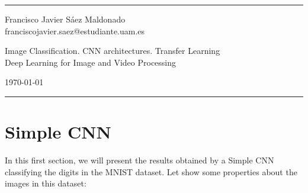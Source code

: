 \documentclass[a4paper]{article}
\begin{document}

\fancyhead[C]{}
\hrule \medskip %
\begin{minipage}{0.295\textwidth}
  \raggedright
  \footnotesize
  Francisco Javier Sáez Maldonado \hfill\\
  franciscojavier.saez@estudiante.uam.es
  \hfill\\
\end{minipage}
\begin{minipage}{0.4\textwidth}
  \centering
  \large
  Image Classification. CNN architectures. Transfer Learning\\
  \normalsize
  Deep Learning for Image and Video Processing\\
\end{minipage}
\begin{minipage}{0.295\textwidth}
  \raggedleft
  \today\hfill\\
\end{minipage}
\medskip\hrule


\section{Simple CNN}

In this first section, we will present the results obtained by a Simple CNN classifying the digits in the MNIST dataset. Let show some properties about the images in this dataset:
\end{document}

